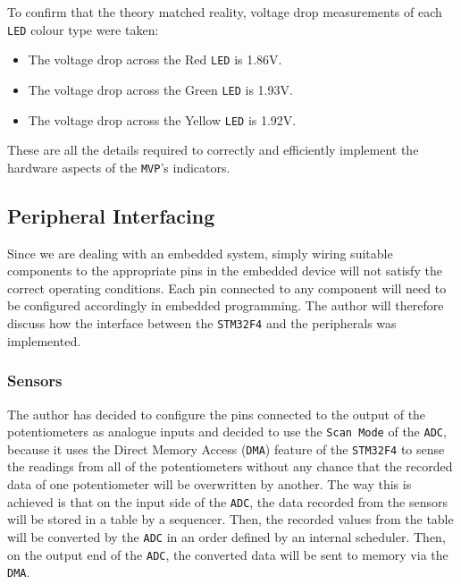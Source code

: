 \documentclass[12pt]{article}
\begin{document}
To confirm that the theory matched reality, voltage drop measurements of each \texttt{LED} colour type were taken:

\begin{itemize}
    \item The voltage drop across the Red \texttt{LED} is 1.86V.
    \item The voltage drop across the Green \texttt{LED} is 1.93V.
    \item The voltage drop across the Yellow \texttt{LED} is 1.92V.
\end{itemize}

These are all the details required to correctly and efficiently implement the hardware aspects of the \texttt{MVP}'s indicators.

\subsection{Peripheral Interfacing}
Since we are dealing with an embedded system, simply wiring suitable components to the appropriate pins in the embedded device will not satisfy the correct operating conditions. Each pin connected to any component will need to be configured accordingly in embedded programming. The author will therefore discuss how the interface between the \texttt{STM32F4} and the peripherals was implemented.
\subsubsection{Sensors}
The author has decided to configure the pins connected to the output of the potentiometers as analogue inputs and decided to use the \texttt{Scan Mode} of the \texttt{ADC}, because it uses the Direct Memory Access (\texttt{DMA}) feature of the \texttt{STM32F4} to sense the readings from all of the potentiometers without any chance that the recorded data of one potentiometer will be overwritten by another. The way this is achieved is that on the input side of the \texttt{ADC}, the data recorded from the sensors will be stored in a table by a sequencer. Then, the recorded values from the table will be converted by the \texttt{ADC} in an order defined by an internal scheduler. Then, on the output end of the \texttt{ADC}, the converted data will be sent to memory via the \texttt{DMA}.
\end{document}
